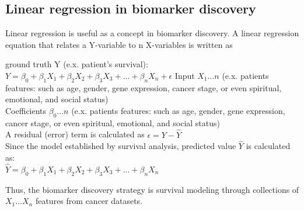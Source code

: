 \documentclass[jpm,article,submit,moreauthors,pdftex]{Definitions/mdpi}
\begin{document}
\subsection*{Linear regression in biomarker discovery}
Linear regression is useful as a concept in biomarker discovery.
A linear regression equation that relates a Y-variable to n X-variables is written as%
\par
\begin{flushleft}

ground truth Y (e.x. patient's survival):\\[0.5cm]
$Y = \beta_0 + \beta_1 X_1 + \beta_2 X_2 + \beta_3 X_3 + ... + \beta_n X_n + \epsilon$
\linebreak
\linebreak
Input $X_1...n$ (e.x. patients features: such as age, gender, gene expression, cancer stage, or even spiritual, emotional, and social status)
\\[0.5cm]
Coefficients $\beta_0...n$ (e.x. patients features: such as age, gender, gene expression, cancer stage, or even spiritual, emotional, and social status)\\[0.5cm]
A residual (error) term is calculated as $\epsilon=Y - \hat Y$\\
Since the model established by survival analysis, predicted value $\hat Y$ is calculated as:\\[0.3cm]
$\hat Y = \beta_0 + \beta_1 X_1 + \beta_2 X_2 + \beta_3 X_3 + ... + \beta_n X_n$
\linebreak
\end{flushleft}
Thus, the biomarker discovery strategy is survival modeling through collections of $X_1...X_n$ features from cancer datasets.
\end{document}
